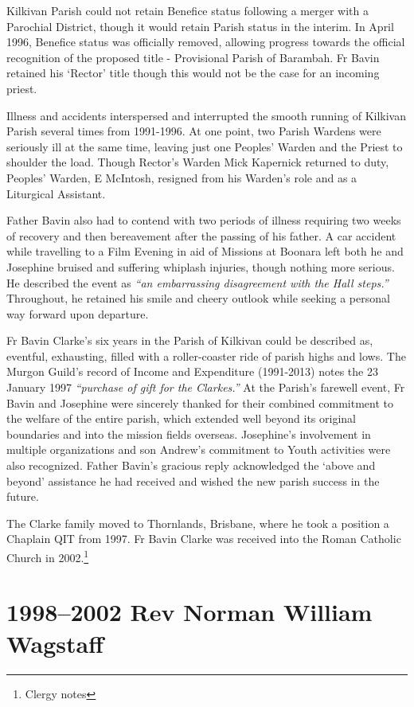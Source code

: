 Kilkivan Parish could not retain Benefice status following a merger with a Parochial District, though it would retain Parish status in the interim. In April 1996, Benefice status was officially removed, allowing progress towards the official recognition of the proposed title - Provisional Parish of Barambah. Fr Bavin retained his `Rector' title though this would not be the case for an incoming priest.

Illness and accidents interspersed and interrupted the smooth running of Kilkivan Parish several times from 1991-1996. At one point, two Parish Wardens were seriously ill at the same time, leaving just one Peoples' Warden and the Priest to shoulder the load. Though Rector's Warden Mick Kapernick returned to duty, Peoples' Warden, E McIntosh, resigned from his Warden's role and as a Liturgical Assistant.

Father Bavin also had to contend with two periods of illness requiring two weeks of recovery and then bereavement after the passing of his father. A car accident while travelling to a Film Evening in aid of Missions at Boonara left both he and Josephine bruised and suffering whiplash injuries, though nothing more serious. He described the event as \emph{``an embarrassing disagreement with the Hall steps.''} Throughout, he retained his smile and cheery outlook while seeking a personal way forward upon departure.

Fr Bavin Clarke's six years in the Parish of Kilkivan could be described as, eventful, exhausting, filled with a roller-coaster ride of parish highs and lows. The Murgon Guild's record of Income and Expenditure (1991-2013) notes the 23 January 1997 \emph{``purchase of gift for the Clarkes.''} At the Parish's farewell event, Fr Bavin and Josephine were sincerely thanked for their combined commitment to the welfare of the entire parish, which extended well beyond its original boundaries and into the mission fields overseas. Josephine's involvement in multiple organizations and son Andrew's commitment to Youth activities were also recognized. Father Bavin's gracious reply acknowledged the `above and beyond' assistance he had received and wished the new parish success in the future.

The Clarke family moved to Thornlands, Brisbane, where he took a position a Chaplain QIT from 1997. Fr Bavin Clarke was received into the Roman Catholic Church in 2002.\footnote{Clergy notes}

\hypertarget{rev-norman-william-wagstaff}{%
\section{1998--2002 Rev Norman William Wagstaff}\label{rev-norman-william-wagstaff}}

